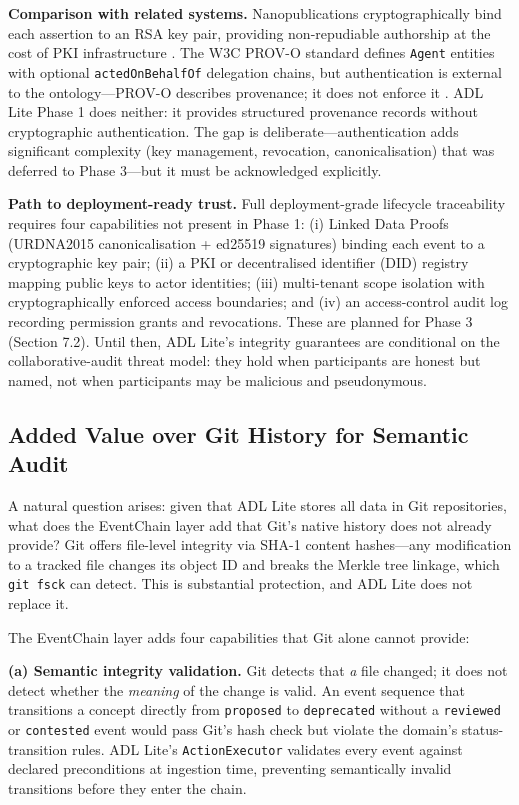 \textbf{Comparison with related systems.} Nanopublications cryptographically bind each assertion to an RSA key pair, providing non-repudiable authorship at the cost of PKI infrastructure \cite{ref18}. The W3C PROV-O standard defines \texttt{Agent} entities with optional \texttt{actedOnBehalfOf} delegation chains, but authentication is external to the ontology---PROV-O describes provenance; it does not enforce it \cite{ref19}. ADL Lite Phase 1 does neither: it provides structured provenance records without cryptographic authentication. The gap is deliberate---authentication adds significant complexity (key management, revocation, canonicalisation) that was deferred to Phase 3---but it must be acknowledged explicitly.

\textbf{Path to deployment-ready trust.} Full deployment-grade lifecycle traceability requires four capabilities not present in Phase 1: (i) Linked Data Proofs (URDNA2015 canonicalisation + ed25519 signatures) binding each event to a cryptographic key pair; (ii) a PKI or decentralised identifier (DID) registry mapping public keys to actor identities; (iii) multi-tenant scope isolation with cryptographically enforced access boundaries; and (iv) an access-control audit log recording permission grants and revocations. These are planned for Phase 3 (Section 7.2). Until then, ADL Lite's integrity guarantees are conditional on the collaborative-audit threat model: they hold when participants are honest but named, not when participants may be malicious and pseudonymous.

\subsection{Added Value over Git History for Semantic Audit}\label{added-value-over-git-history-for-semantic-audit}

A natural question arises: given that ADL Lite stores all data in Git repositories, what does the EventChain layer add that Git's native history does not already provide? Git offers file-level integrity via SHA-1 content hashes---any modification to a tracked file changes its object ID and breaks the Merkle tree linkage, which \texttt{git\ fsck} can detect. This is substantial protection, and ADL Lite does not replace it.

The EventChain layer adds four capabilities that Git alone cannot provide:

\textbf{(a) Semantic integrity validation.} Git detects that \emph{a} file changed; it does not detect whether the \emph{meaning} of the change is valid. An event sequence that transitions a concept directly from \texttt{proposed} to \texttt{deprecated} without a \texttt{reviewed} or \texttt{contested} event would pass Git's hash check but violate the domain's status-transition rules. ADL Lite's \texttt{ActionExecutor} validates every event against declared preconditions at ingestion time, preventing semantically invalid transitions before they enter the chain.

